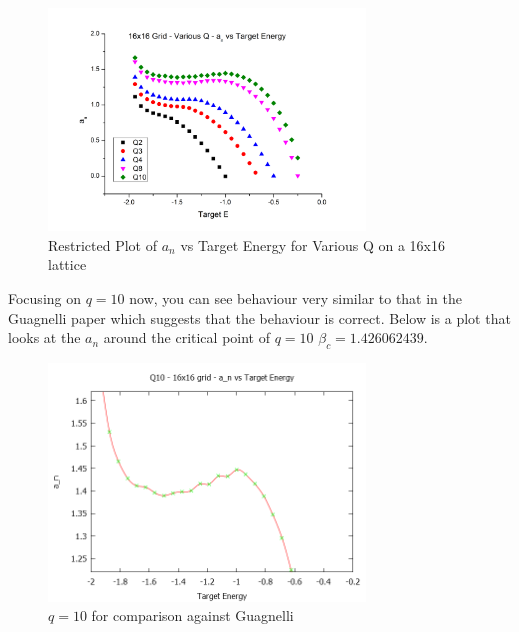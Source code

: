 \documentclass[10pt,a4paper]{article}
\begin{document}
\begin{figure}[H]
    \centering
    \includegraphics[width=0.75\textwidth]{variousq16x16.png}
    \caption{Restricted Plot of $a_n$ vs Target Energy for Various Q on a 16x16 lattice}
\end{figure}

Focusing on $q=10$ now, you can see behaviour very similar to that in the Guagnelli paper which suggests that the behaviour is correct.
Below is a plot that looks at the $a_n$ around the critical point of $q=10$ $\beta_c = 1.426062439$.
\begin{figure}[H]
    \centering
    \includegraphics[width=0.75\textwidth]{q1016x16.png}
    \caption{$q=10$ for comparison against Guagnelli}
\end{figure}
\end{document}
